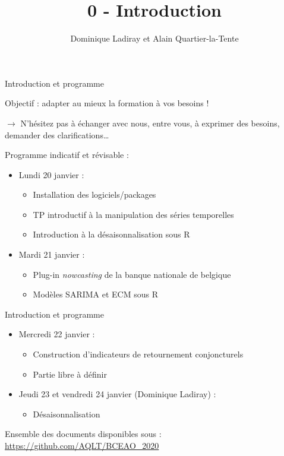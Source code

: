 \documentclass[10pt,xcolor=table,color={dvipsnames,usenames},ignorenonframetext,usepdftitle=false,french]{beamer}
\title{0 - Introduction}
\author{Dominique Ladiray et Alain Quartier-la-Tente}
\date{}
\providecommand{\tightlist}{%
  \setlength{\parskip}{0pt}
  }
\begin{document}

\begin{frame}{Introduction et programme}
\protect\hypertarget{introduction-et-programme}{}

Objectif : adapter au mieux la formation à vos besoins !

\(\rightarrow\) N'hésitez pas à échanger avec nous, entre vous, à
exprimer des besoins, demander des clarifications\ldots{}

\pause

Programme indicatif et révisable :

\begin{itemize}
\item
  Lundi 20 janvier :

  \begin{itemize}
  \item
    Installation des logiciels/packages
  \item
    TP introductif à la manipulation des séries temporelles
  \item
    Introduction à la désaisonnalisation sous R
  \end{itemize}

  \pause
\item
  Mardi 21 janvier :

  \begin{itemize}
  \item
    Plug-in \emph{nowcasting} de la banque nationale de belgique
  \item
    Modèles SARIMA et ECM sous R
  \end{itemize}
\end{itemize}

\end{frame}

\begin{frame}{Introduction et programme}
\protect\hypertarget{introduction-et-programme-1}{}

\begin{itemize}
\item
  Mercredi 22 janvier :

  \begin{itemize}
  \item
    Construction d'indicateurs de retournement conjoncturels
  \item
    Partie libre à définir
  \end{itemize}
\item
  Jeudi 23 et vendredi 24 janvier (Dominique Ladiray) :

  \begin{itemize}
  \tightlist
  \item
    Désaisonnalisation
  \end{itemize}
\end{itemize}

\medskip

Ensemble des documents disponibles sous :
\url{https://github.com/AQLT/BCEAO_2020}

\end{frame}
\end{document}
